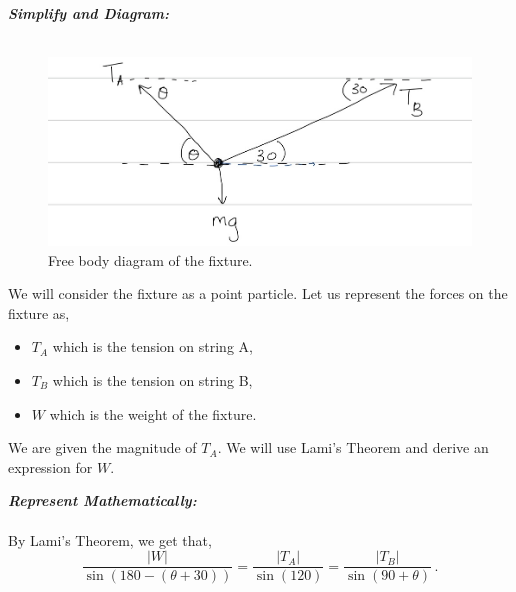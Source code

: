 \begin{subquestions}
\begin{subsubquestions}
		
		\textbf{\textit{Simplify and Diagram:}} \\ \\
		\begin{figure}[H]
			\begin{center}
				\includegraphics[scale=0.25]{../2016/figures/2016q5-2}
				\caption{\label{2016:q55:Diagram1} Free body diagram of the fixture.}
			\end{center}
		\end{figure}
		We will consider the fixture as a point particle. Let us represent the forces on the fixture as,
		\begin{itemize}
			\item $T_A$ which is the tension on string A,
			\item $T_B$ which is the tension on string B, 
			\item $W$ which is the weight of the fixture.
		\end{itemize}
		We are given the magnitude of $T_A$. We will use Lami's Theorem and derive an expression for $W$.
		
		
		
		
		\textbf{\textit{Represent Mathematically:}} \\ \\
		By Lami's Theorem, we get that,
		\begin{equation}
			\frac{|W|}{\sin(180-(\theta+30))}=\frac{|T_A|}{\sin(120)} = \frac{|T_B|}{\sin(90+\theta)} \,.
		\end{equation}
		
		
		

\end{subsubquestions}
\end{subquestions}
